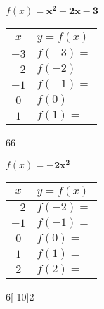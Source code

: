 \documentclass[12pt,letterpaper]{memoir}
\begin{document}
%
%
\myWideProblemWithContent
{
    \small
    \begin{center}
    $f(x) = \bm{x^2 + 2x - 3}$
    \end{center}
    \begin{minipage}{0.6\textwidth}
        \renewcommand{\arraystretch}{1.75}
        \begin{tabular}{c|p{3in}}
                \hline
            $x$ & $y = f(x)$ \\
            \hline\hline 
            $-3$ & $f(-3) =$ \\\hline
            $-2$ & $f(-2) =$ \\\hline
            $-1$ & $f(-1) =$ \\\hline
            $0$  & $f(0) =$ \\\hline
            $1$  & $f(1) =$ \\\hline 
        \end{tabular}
    \end{minipage}
    \begin{minipage}{0.4\textwidth}
        \begin{myTikzpictureGrid}{0.35} {6}{6}
        \end{myTikzpictureGrid}
    \end{minipage}
}

%
%
\myWideProblemWithContent
{
    \small
    \begin{center}
    $f(x) = \bm{-2x^2}$
    \end{center}
    \begin{minipage}{0.6\textwidth}
        \renewcommand{\arraystretch}{1.75}
        \begin{tabular}{c|p{3in}}
                \hline
            $x$ & $y = f(x)$ \\
            \hline\hline 
            $-2$ & $f(-2) =$ \\\hline
            $-1$ & $f(-1) =$ \\\hline
            $0$  & $f(0) =$ \\\hline
            $1$  & $f(1) =$ \\\hline 
            $2$  & $f(2) =$ \\\hline
        \end{tabular}
    \end{minipage}
    \begin{minipage}{0.4\textwidth}
        \begin{myTikzpictureGrid}{0.35} {6}[-10]{2}
        \end{myTikzpictureGrid}
    \end{minipage}
}
\end{document}
